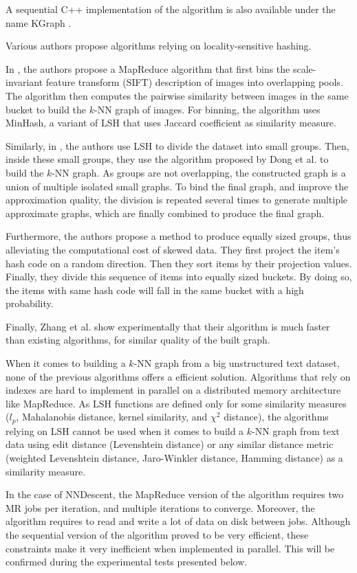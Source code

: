 \documentclass[wcp]{jmlr}
\begin{document}
A sequential C++ implementation of the algorithm is also available under the name KGraph \cite{kgraph}.

Various authors propose algorithms relying on locality-sensitive hashing.

In \cite{Hsieh2012}, the authors propose a MapReduce algorithm that first bins the scale-invariant feature transform (SIFT) description of images into overlapping pools. The algorithm then computes the pairwise similarity between images in the same bucket to build the $k$-NN graph of images. For binning, the algorithm uses MinHash, a variant of LSH that uses Jaccard coefficient as similarity measure.

Similarly, in \cite{Zhang2013}, the authors use LSH to divide the dataset into small groups. Then, inside these small groups, they use the algorithm proposed by Dong et al. to build the $k$-NN graph. As groups are not overlapping, the constructed graph is a union of multiple isolated small graphs. To bind the final graph, and improve the approximation quality, the division is repeated several times to generate multiple approximate graphs, which are finally combined to produce the final graph.

Furthermore, the authors propose a method to produce equally sized groups, thus alleviating the computational cost of skewed data. They first project the item's hash code on a random direction. Then they sort items by their projection values. Finally, they divide this sequence of items into equally sized buckets. By doing so, the items with same hash code will fall in the same bucket with a high probability.

Finally, Zhang et al. show experimentally that their algorithm is much faster than existing algorithms, for similar quality of the built graph.

When it comes to building a $k$-NN graph from a big unstructured text dataset, none of the previous algorithms offers a efficient solution. Algorithms that rely on indexes are hard to implement in parallel on a distributed memory architecture like MapReduce. As LSH functions are defined only for some similarity measures ($l_p$, Mahalanobis distance, kernel similarity, and $\chi^2$ distance), the algorithms relying on LSH cannot be used when it comes to build a $k$-NN graph from text data using edit distance (Levenshtein distance) or any similar distance metric (weighted Levenshtein distance, Jaro-Winkler distance, Hamming distance) as a similarity measure.

In the case of NNDescent, the MapReduce version of the algorithm requires two MR jobs per iteration, and multiple iterations to converge. Moreover, the algorithm requires to read and write a lot of data on disk between jobs. Although the sequential version of the algorithm proved to be very efficient, these constraints make it very inefficient when implemented in parallel. This will be confirmed during the experimental tests presented below.
\end{document}
